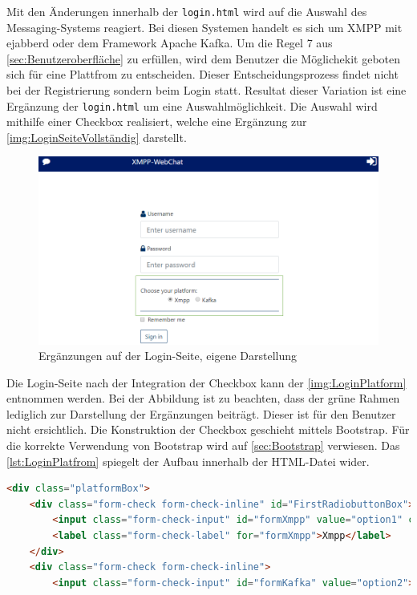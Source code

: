 \documentclass[a4paper,titlepage,halfparskip,12pt]{scrreprt}
\begin{document}
\begin{onehalfspacing}
Mit den Änderungen innerhalb der \texttt{login.html} wird auf die Auswahl des Messaging-Systems reagiert. Bei diesen Systemen handelt es sich um XMPP mit ejabberd oder dem Framework Apache Kafka. Um die Regel 7 aus \autoref{sec:Benutzeroberfläche} zu erfüllen, wird dem Benutzer die Möglichekit geboten sich für eine Plattfrom zu entscheiden. Dieser Entscheidungsprozess findet nicht bei der Registrierung sondern beim Login statt. Resultat dieser Variation ist eine Ergänzung der \texttt{login.html} um eine Auswahlmöglichkeit. Die Auswahl wird mithilfe einer Checkbox realisiert, welche eine Ergänzung zur \autoref{img:LoginSeiteVollständig} darstellt.
\begin{figure}[h]
	\centering
	\includegraphics[scale=0.4]{images/LoginPlatform}
	\caption{Ergänzungen auf der Login-Seite, eigene Darstellung}
	\label{img:LoginPlatform}
\end{figure}
Die Login-Seite nach der Integration der Checkbox kann der \autoref{img:LoginPlatform} entnommen werden. Bei der Abbildung ist zu beachten, dass der grüne Rahmen lediglich zur Darstellung der Ergänzungen beiträgt. Dieser ist für den Benutzer nicht ersichtlich. Die Konstruktion der Checkbox geschieht mittels Bootstrap. Für die korrekte Verwendung von Bootstrap wird auf \autoref{sec:Bootstrap} verwiesen. Das \autoref{lst:LoginPlatfrom} spiegelt der Aufbau innerhalb der HTML-Datei wider.
\begin{lstlisting}[language=HTML,caption=Implementierung der Checkbox für die Plattform ,label={lst:LoginPlatfrom}]
<div class="platformBox">
	<div class="form-check form-check-inline" id="FirstRadiobuttonBox">
		<input class="form-check-input" id="formXmpp" value="option1" checked>
		<label class="form-check-label" for="formXmpp">Xmpp</label>
	</div>
	<div class="form-check form-check-inline">
		<input class="form-check-input" id="formKafka" value="option2">

\end{lstlisting}
\end{onehalfspacing}
\end{document}
